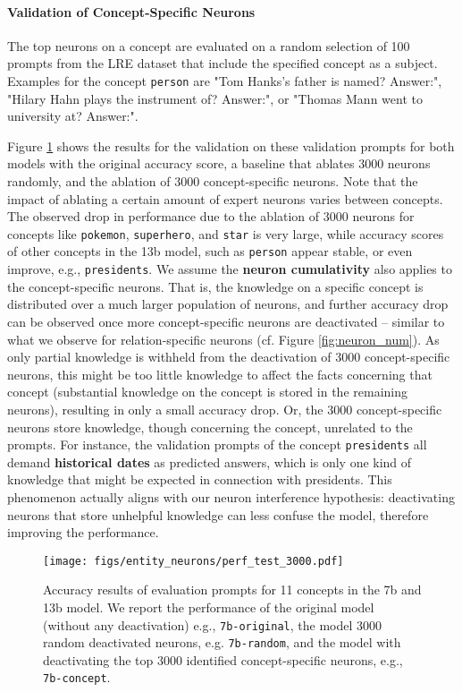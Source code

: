 \paragraph{Validation of Concept-Specific Neurons}
The top neurons on a concept are evaluated on a random selection of 100 prompts from the LRE dataset that include the specified concept as a subject. Examples for the concept \texttt{person} are "Tom Hanks's father is named? Answer:", "Hilary Hahn plays the instrument of? Answer:", or "Thomas Mann went to university at? Answer:".

Figure \ref{fig:concept_neuron_validation} shows the results for the validation on these validation prompts for both models with the original accuracy score, a baseline that ablates 3000 neurons randomly, and the ablation of 3000 concept-specific neurons. Note that the impact of ablating a certain amount of expert neurons varies between concepts. The observed drop in performance due to the ablation of 3000 neurons for concepts like \texttt{pokemon}, \texttt{superhero}, and \texttt{star} is very large, 
while accuracy scores of other concepts in the 13b model, such as \texttt{person} appear stable, or even improve, e.g., \texttt{presidents}. 
We assume the \textbf{neuron cumulativity} also applies to the concept-specific neurons. 
That is, the knowledge on a specific concept is distributed over a much larger population of neurons, and further accuracy drop can be observed once more concept-specific neurons are deactivated -- similar to what we observe for relation-specific neurons (cf. Figure \ref{fig:neuron_num}). 
As only partial knowledge is withheld from the deactivation of 3000 concept-specific neurons, 
this might be too little knowledge to affect the facts concerning that concept (substantial knowledge on the concept is stored in the remaining neurons), resulting in only a small accuracy drop.
Or, the 3000 concept-specific neurons store knowledge, though concerning the concept, unrelated to the prompts.
For instance, the validation prompts of the concept \texttt{presidents} all demand \textbf{historical dates} as predicted answers, which is only one kind of knowledge that might be expected in connection with presidents.
This phenomenon actually aligns with our neuron interference hypothesis: deactivating neurons that store unhelpful knowledge can less confuse the model, therefore improving the performance.


\begin{figure}
    \centering
    \setlength{\abovecaptionskip}{-0.1cm}
\texttt{[image: figs/entity\_neurons/perf\_test\_3000.pdf]}
    \caption{Accuracy results of evaluation prompts for 11 concepts in the 7b and 13b model. We report the performance of the original model (without any deactivation) e.g., \texttt{7b-original}, the model 3000 random deactivated neurons, e.g. \texttt{7b-random}, and the model with deactivating the top 3000 identified concept-specific neurons, e.g., \texttt{7b-concept}.}
    \label{fig:concept_neuron_validation}
\end{figure}
